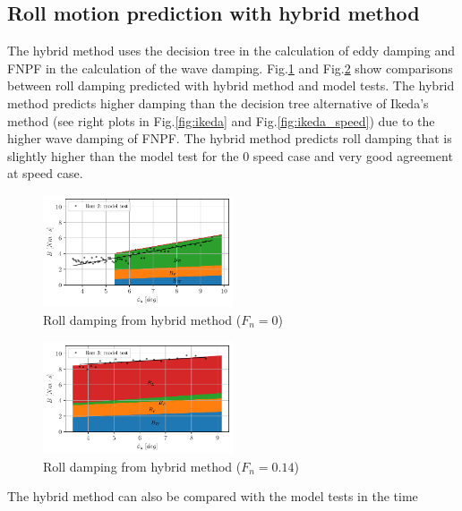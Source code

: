 \subsection*{Roll motion prediction with hybrid
method}\label{roll-motion-prediction-with-hybrid-method}
The hybrid method uses the decision tree in the calculation of eddy
damping and FNPF in the calculation of the wave damping.
Fig.\ref{fig:hybrid_0} and Fig.\ref{fig:hybrid_speed}
show comparisons between roll damping predicted with hybrid method and
model tests. The hybrid method predicts higher damping than the decision
tree alternative of Ikeda's method (see right plots in
Fig.\ref{fig:ikeda} and Fig.\ref{fig:ikeda_speed}) due
to the higher wave damping of FNPF. The hybrid method predicts roll
damping that is slightly higher than the model test for the 0 speed case
and very good agreement at speed case.
\begin{figure}[H]
\begin{center}\includegraphics[width = 0.5\textwidth]{figures/hybrid_0.pdf}\end{center}
\vspace{-1cm}
\caption{Roll damping from hybrid method ($F_n = 0$)}
\label{fig:hybrid_0}
\end{figure}
\begin{figure}[H]
\begin{center}\includegraphics[width = 0.5\textwidth]{figures/hybrid_speed.pdf}\end{center}
\vspace{-1cm}
\caption{Roll damping from hybrid method ($F_n = 0.14$)}
\label{fig:hybrid_speed}
\end{figure}
The hybrid method can also be compared with the model tests in the time
